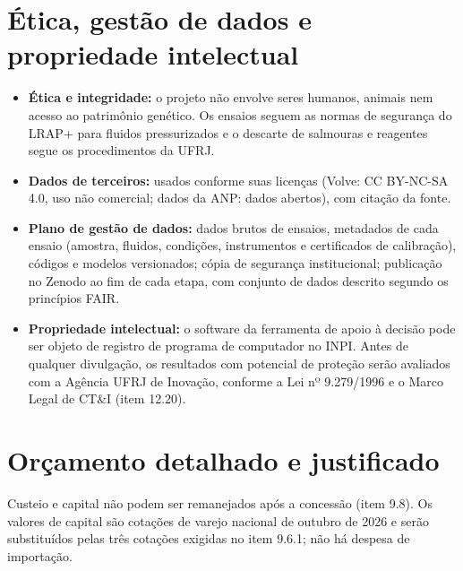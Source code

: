 \documentclass[11pt,a4paper]{article}
\newcommand{\itemedital}[1]{}
\begin{document}
\section{Ética, gestão de dados e propriedade intelectual}\label{sec:etica}\itemedital{2.16 XXVI; 12.20}
\begin{itemize}
  \item \textbf{Ética e integridade:} o projeto não envolve seres humanos, animais nem acesso ao
        patrimônio genético. Os ensaios seguem as normas de segurança do LRAP+ para fluidos
        pressurizados e o descarte de salmouras e reagentes segue os procedimentos da UFRJ.
  \item \textbf{Dados de terceiros:} usados conforme suas licenças (Volve: CC BY-NC-SA 4.0,
        uso não comercial; dados da ANP: dados abertos), com citação da fonte.
  \item \textbf{Plano de gestão de dados:} dados brutos de ensaios, metadados de cada ensaio
        (amostra, fluidos, condições, instrumentos e certificados de calibração), códigos e
        modelos versionados; cópia de segurança institucional; publicação no Zenodo ao fim de
        cada etapa, com conjunto de dados descrito segundo os princípios FAIR.
  \item \textbf{Propriedade intelectual:} o software da ferramenta de apoio à decisão pode ser
        objeto de registro de programa de computador no INPI. Antes de qualquer divulgação, os resultados
        com potencial de proteção serão avaliados com a Agência UFRJ de Inovação, conforme a
        Lei nº 9.279/1996 e o Marco Legal de CT\&I (item 12.20).
\end{itemize}

\section{Orçamento detalhado e justificado}\label{sec:orcamento}\itemedital{2.16 XXV; 9; Anexo 1 H}

Custeio e capital não podem ser remanejados após a concessão (item 9.8). Os valores de
capital são cotações de varejo nacional de outubro de 2026 e serão substituídos pelas três
cotações exigidas no item 9.6.1; não há despesa de importação.
\end{document}
